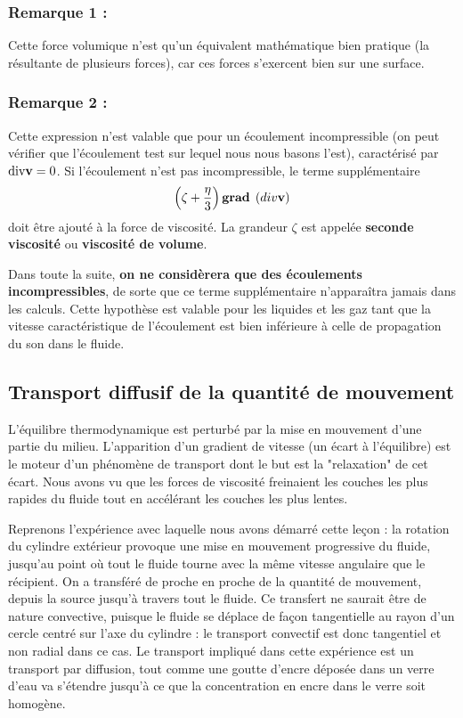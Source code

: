 \documentclass[11pt,a4paper]{report}
\begin{document}
\subsubsection{Remarque 1 :}
Cette force volumique n'est qu'un équivalent mathématique bien pratique (la résultante de plusieurs forces), car ces forces s'exercent bien sur une surface.

\subsubsection{Remarque 2 :}
Cette expression n'est valable que pour un écoulement incompressible (on peut vérifier que l'écoulement test sur lequel nous nous basons l'est), caractérisé par $\text{div}\bold{v} = 0$. Si l'écoulement n'est pas incompressible, le terme supplémentaire
\begin{equation}
	\left(\zeta + \frac{\eta}{3} \right)\textbf{grad}\;\left(div\bold{v}\right)
\end{equation}
doit être ajouté à la force de viscosité. La grandeur $\zeta$ est appelée \textbf{seconde viscosité} ou \textbf{viscosité de volume}.

Dans toute la suite, \textbf{on ne considèrera que des écoulements incompressibles}, de sorte que ce terme supplémentaire n'apparaîtra jamais dans les calculs. Cette hypothèse est valable pour les liquides et les gaz tant que la vitesse caractéristique de l'écoulement est bien inférieure à celle de propagation du son dans le fluide.

\subsection{Transport diffusif de la quantité de mouvement}\label{sec:1.2}

L'équilibre thermodynamique est perturbé par la mise en mouvement d'une partie du milieu. L'apparition d'un gradient de vitesse (un écart à l'équilibre) est le moteur d'un phénomène de transport dont le but est la "relaxation" de cet écart. Nous avons vu que les forces de viscosité freinaient les couches les plus rapides du fluide tout en accélérant les couches les plus lentes. 

Reprenons l'expérience avec laquelle nous avons démarré cette leçon : la rotation du cylindre extérieur provoque une mise en mouvement progressive du fluide, jusqu'au point où tout le fluide tourne avec la même vitesse angulaire que le récipient. On a transféré de proche en proche de la quantité de mouvement, depuis la source jusqu'à travers tout le fluide. Ce transfert ne saurait être de nature convective, puisque le fluide se déplace de façon tangentielle au rayon d'un cercle centré sur l'axe du cylindre : le transport convectif est donc tangentiel et non radial dans ce cas. Le transport impliqué dans cette expérience est un transport par diffusion, tout comme une goutte d'encre déposée dans un verre d'eau va s'étendre jusqu'à ce que la concentration en encre dans le verre soit homogène.
\end{document}
